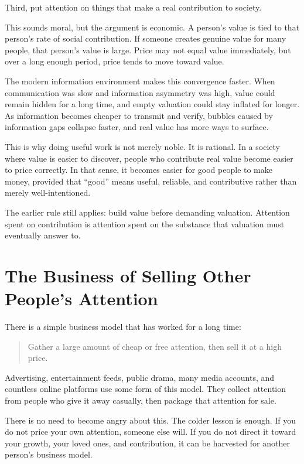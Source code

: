 Third, put attention on things that make a real contribution to society.

This sounds moral, but the argument is economic. A person's value is tied to that person's rate of social contribution. If someone creates genuine value for many people, that person's value is large. Price may not equal value immediately, but over a long enough period, price tends to move toward value.

The modern information environment makes this convergence faster. When communication was slow and information asymmetry was high, value could remain hidden for a long time, and empty valuation could stay inflated for longer. As information becomes cheaper to transmit and verify, bubbles caused by information gaps collapse faster, and real value has more ways to surface.

This is why doing useful work is not merely noble. It is rational. In a society where value is easier to discover, people who contribute real value become easier to price correctly. In that sense, it becomes easier for good people to make money, provided that ``good'' means useful, reliable, and contributive rather than merely well-intentioned.

The earlier rule still applies: build value before demanding valuation. Attention spent on contribution is attention spent on the substance that valuation must eventually answer to.

\section*{The Business of Selling Other People's Attention}

There is a simple business model that has worked for a long time:

\begin{quote}
Gather a large amount of cheap or free attention, then sell it at a high price.
\end{quote}

Advertising, entertainment feeds, public drama, many media accounts, and countless online platforms use some form of this model. They collect attention from people who give it away casually, then package that attention for sale.

There is no need to become angry about this. The colder lesson is enough. If you do not price your own attention, someone else will. If you do not direct it toward your growth, your loved ones, and contribution, it can be harvested for another person's business model.

